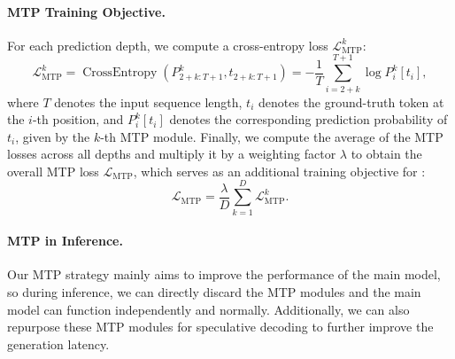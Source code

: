 \paragraph{MTP Training Objective.}
For each prediction depth, we compute a cross-entropy loss $\mathcal{L}_{\text{MTP}}^{k}$:
\begin{equation}
    \mathcal{L}_{\text{MTP}}^{k} = \operatorname{CrossEntropy}(P_{2 + k:T + 1}^{k}, t_{2 + k:T + 1}) = -\frac{1}{T} \sum_{i=2 + k}^{T + 1} \log P_i^k [t_i],
\end{equation}
where $T$ denotes the input sequence length, $t_i$ denotes the ground-truth token at the $i$-th position, and $P_i^k [t_i]$ denotes the corresponding prediction probability of $t_i$, given by the $k$-th MTP module. 
Finally, we compute the average of the MTP losses across all depths and multiply it by a weighting factor $\lambda$ to obtain the overall MTP loss $\mathcal{L}_{\text{MTP}}$, which serves as an additional training objective for \dsviii{}:
\begin{equation}
    \mathcal{L}_{\text{MTP}} = \frac{\lambda}{D} \sum_{k=1}^{D} \mathcal{L}_{\text{MTP}}^{k}.
\end{equation}

\paragraph{MTP in Inference.}
Our MTP strategy mainly aims to improve the performance of the main model, so during inference, we can directly discard the MTP modules and the main model can function independently and normally.
Additionally, we can also repurpose these MTP modules for speculative decoding to further improve the generation latency.
